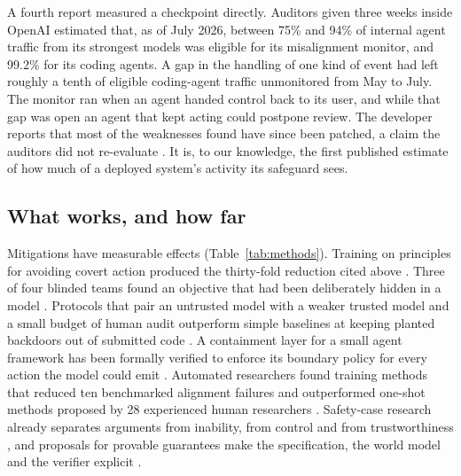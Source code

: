 \documentclass[10pt,twocolumn]{article}
\theoremstyle{plain}
\theoremstyle{definition}
\begin{document}
A fourth report measured a checkpoint directly. Auditors given three weeks inside OpenAI
estimated that, as of July 2026, between 75\% and 94\% of internal agent traffic from its
strongest models was eligible for its misalignment monitor, and 99.2\% for its coding agents.
A gap in the handling of one kind of event had left roughly a tenth of eligible coding-agent
traffic unmonitored from May to July. The monitor ran when an agent handed control back to
its user, and while that gap was open an agent that kept acting could postpone review. The
developer reports that most of the weaknesses found have since been patched, a claim the
auditors did not re-evaluate \cite{metr2026audit}. It is, to our knowledge, the first
published estimate of how much of a deployed system's activity its safeguard sees.

\subsection{What works, and how far}

Mitigations have measurable effects (Table~\ref{tab:methods}). Training on principles for
avoiding covert action produced the thirty-fold reduction cited above \cite{schoen2025}.
Three of four blinded teams found an objective that had been deliberately hidden in a model
\cite{marks2025}. Protocols that pair an untrusted model with a weaker trusted model and a
small budget of human audit outperform simple baselines at keeping planted backdoors out of
submitted code \cite{greenblatt2024control}. A containment layer for a small agent framework
has been formally verified to enforce its boundary policy for every action the model could
emit \cite{moon2026}. Automated researchers found training methods that reduced ten
benchmarked alignment failures and outperformed one-shot methods proposed by 28 experienced
human researchers \cite{chen2026aar}. Safety-case research already separates arguments
from inability, from control and from trustworthiness \cite{balesni2024}, and proposals for
provable guarantees make the specification, the world model and the verifier explicit
\cite{dalrymple2024}.
\end{document}
